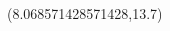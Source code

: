 \documentclass[22pt]{beamer}
\begin{document}
\begin{frame}[fragile]
\begin{textblock}{7.25}

\end{textblock}


\begin{textblock}{2}(8.068571428571428,13.7)

\end{textblock}

\end{frame}
\end{document}
